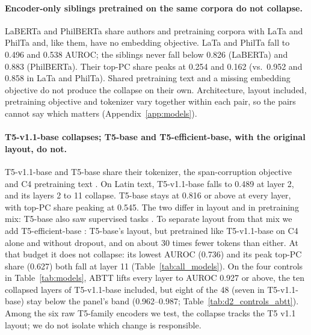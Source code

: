\documentclass[11pt]{article}
\begin{document}
\paragraph{Encoder-only siblings pretrained on the same corpora do not collapse.}
LaBERTa and PhilBERTa share authors and pretraining corpora with LaTa and PhilTa \citep{lata2023card,laberta2023card,riemenschneider2023lata} and, like them, have no embedding objective.
LaTa and PhilTa fall to 0.496 and 0.538 AUROC; the siblings never fall below 0.826 (LaBERTa) and 0.883 (PhilBERTa).
Their top-PC share peaks at 0.254 and 0.162 (vs.\ 0.952 and 0.858 in LaTa and PhilTa).
Shared pretraining text and a missing embedding objective do not produce the collapse on their own.
Architecture, layout included, pretraining objective and tokenizer vary together within each pair, so the pairs cannot say which matters (Appendix~\ref{app:models}).

\paragraph{T5-v1.1-base collapses; T5-base and T5-efficient-base, with the original layout, do not.}
T5-v1.1-base and T5-base share their tokenizer, the span-corruption objective and C4 pretraining text \citep{raffel2020t5,t5v11release}.
On Latin text, T5-v1.1-base falls to 0.489 at layer 2, and its layers 2 to 11 collapse.
T5-base stays at 0.816 or above at every layer, with top-PC share peaking at 0.545.
The two differ in layout and in pretraining mix: T5-base also saw supervised tasks \citep{raffel2020t5}.
To separate layout from that mix we add T5-efficient-base \citep{tay2022scale}: T5-base's layout, but pretrained like T5-v1.1-base on C4 alone and without dropout, and on about 30 times fewer tokens than either.
At that budget it does not collapse: its lowest AUROC (0.736) and its peak top-PC share (0.627) both fall at layer 11 (Table~\ref{tab:all_models}).
On the four controls in Table~\ref{tab:models}, ABTT lifts every layer to AUROC 0.927 or above, the ten collapsed layers of T5-v1.1-base included, but eight of the 48 (seven in T5-v1.1-base) stay below the panel's band (0.962--0.987; Table~\ref{tab:d2_controls_abtt}).
Among the six raw T5-family encoders we test, the collapse tracks the T5 v1.1 layout; we do not isolate which change is responsible.
\end{document}
